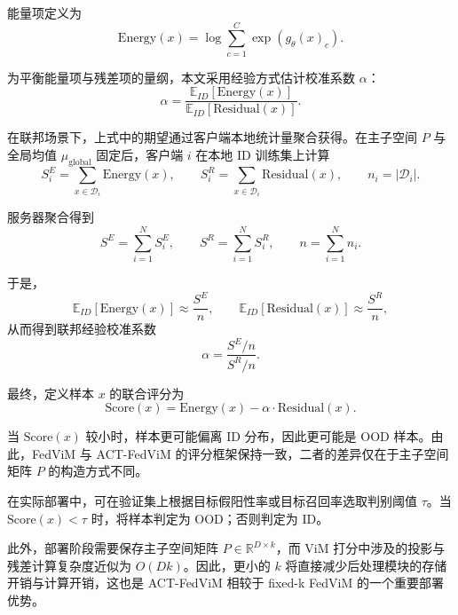 能量项定义为
\[
\text{Energy}(x)=\log\sum_{c=1}^{C}\exp(g_\theta(x)_c).
\]

为平衡能量项与残差项的量纲，本文采用经验方式估计校准系数 $\alpha$：
\[
\alpha=\frac{\mathbb{E}_{ID}[\text{Energy}(x)]}{\mathbb{E}_{ID}[\text{Residual}(x)]}.
\]

在联邦场景下，上式中的期望通过客户端本地统计量聚合获得。在主子空间 $P$ 与全局均值 $\mu_{\text{global}}$ 固定后，客户端 $i$ 在本地 ID 训练集上计算
\[
S_i^{E}=\sum_{x\in\mathcal{D}_i}\text{Energy}(x),\qquad
S_i^{R}=\sum_{x\in\mathcal{D}_i}\text{Residual}(x),\qquad
n_i=|\mathcal{D}_i|.
\]

服务器聚合得到
\[
S^{E}=\sum_{i=1}^{N}S_i^{E},\qquad
S^{R}=\sum_{i=1}^{N}S_i^{R},\qquad
n=\sum_{i=1}^{N}n_i.
\]

于是，
\[
\mathbb{E}_{ID}[\text{Energy}(x)]\approx \frac{S^{E}}{n},
\qquad
\mathbb{E}_{ID}[\text{Residual}(x)]\approx \frac{S^{R}}{n},
\]
从而得到联邦经验校准系数
\[
\alpha=\frac{S^{E}/n}{S^{R}/n}.
\]

最终，定义样本 $x$ 的联合评分为
\[
\text{Score}(x)=\text{Energy}(x)-\alpha\cdot \text{Residual}(x).
\]

当 $\text{Score}(x)$ 较小时，样本更可能偏离 ID 分布，因此更可能是 OOD 样本。由此，FedViM 与 ACT-FedViM 的评分框架保持一致，二者的差异仅在于主子空间矩阵 $P$ 的构造方式不同。

在实际部署中，可在验证集上根据目标假阳性率或目标召回率选取判别阈值 $\tau$。当 $\text{Score}(x)<\tau$ 时，将样本判定为 OOD；否则判定为 ID。

此外，部署阶段需要保存主子空间矩阵 $P\in\mathbb{R}^{D\times k}$，而 ViM 打分中涉及的投影与残差计算复杂度近似为 $O(Dk)$。因此，更小的 $k$ 将直接减少后处理模块的存储开销与计算开销，这也是 ACT-FedViM 相较于 fixed-k FedViM 的一个重要部署优势。

